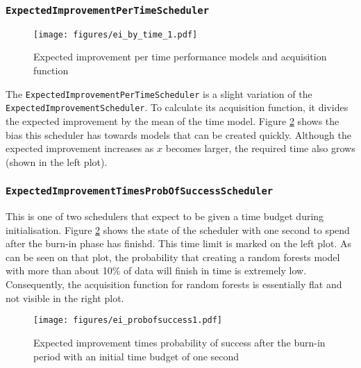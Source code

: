 \documentclass[a4paper,12pt,twoside,openright]{report}
\begin{document}
\subsubsection{\texttt{ExpectedImprovementPerTimeScheduler}}
\begin{figure}
\centering
  \texttt{[image: figures/ei\_by\_time\_1.pdf]}
  \caption{Expected improvement per time performance models and acquisition function}
  \label{sched:expimprpertime01}
\end{figure}

The \texttt{ExpectedImprovementPerTimeScheduler} is a slight variation of the \texttt{ExpectedImprovementScheduler}. To calculate its acquisition function, it divides the expected improvement by the mean of the time model. Figure \ref{sched:expimprpertime01} shows the bias this scheduler has towards models that can be created quickly. Although the expected improvement increases as $x$ becomes larger, the required time also grows (shown in the left plot).

\subsubsection{\texttt{ExpectedImprovementTimesProbOfSuccessScheduler}}

This is one of two schedulers that expect to be given a time budget during initialisation. Figure \ref{sched:expimprpertime01} shows the state of the scheduler with one second to spend after the burn-in phase has finishd. This time limit is marked on the left plot. As can be seen on that plot, the probability that creating a random forests model with more than about 10\% of data will finish in time is extremely low. Consequently, the acquisition function for random forests is essentially flat and not visible in the right plot.

\begin{figure}
\centering
  \texttt{[image: figures/ei\_probofsuccess1.pdf]}
  \caption{Expected improvement times probability of success after the burn-in period with an initial time budget of one second}
  \label{sched:expimprpertime01}
\end{figure}
\end{document}
